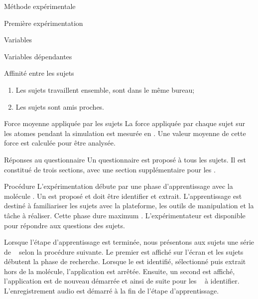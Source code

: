 \documentclass[myfrancais,ngerman,english,french]{mythesis}
\begin{document}
\begin{mychapter}{Méthode expérimentale}
\begin{mysection}{Première expérimentation}
\begin{mysubsection}{Variables}
\begin{mysubsubsection}{Variables dépendantes}
\begin{myparagraph}{ Affinité entre les sujets}
\begin{enumerate}
							\item Les sujets travaillent ensemble, sont dans le même bureau;
							\item Les sujets sont amis proches.
						\end{enumerate}
					\end{myparagraph}
					\begin{myparagraph}{ Force moyenne appliquée par les sujets}
						La force appliquée par chaque sujet sur les atomes pendant la simulation est mesurée en .
						Une valeur moyenne de cette force est calculée pour être analysée.
					\end{myparagraph}
					\begin{myparagraph}{ Réponses au questionnaire}
						Un questionnaire est proposé à tous les sujets.
						Il est constitué de trois sections, avec une section supplémentaire pour les  .
					\end{myparagraph}
				\end{mysubsubsection}
			\end{mysubsection}
			\begin{mysubsection}{Procédure}
				L'expérimentation débute par une phase d'apprentissage avec la molécule \myTRPZIPPER.
				Un  est proposé et doit être identifier et extrait.
				L'apprentissage est destiné à familiariser les sujets avec la plateforme, les outils de manipulation et la tâche à réaliser.
				Cette phase dure maximum .
				L'expérimentateur est disponible pour répondre aux questions des sujets.

				Lorsque l'étape d'apprentissage est terminée, nous présentons aux sujets une série de ~ selon la procédure suivante.
				Le premier  est affiché sur l'écran \myLCD et les sujets débutent la phase de recherche.
				Lorsque le  est identifié, sélectionné puis extrait hors de la molécule, l'application est arrêtée.
				Ensuite, un second  est affiché, l'application est de nouveau démarrée et ainsi de suite pour les ~ à identifier.
				L'enregistrement audio est démarré à la fin de l'étape d'apprentissage.


\end{mysubsection}
\end{mysection}
\end{mychapter}
\end{document}
